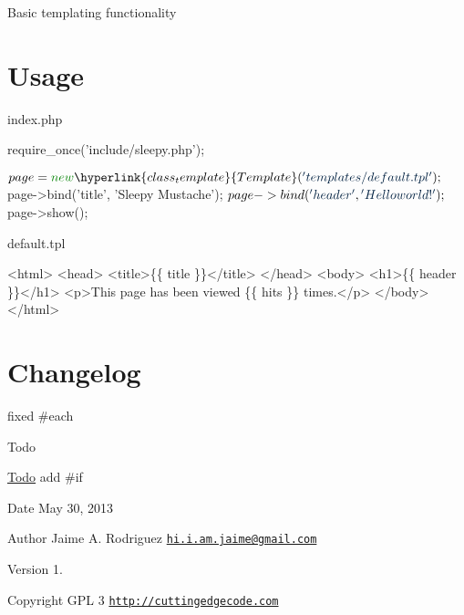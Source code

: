 Basic templating functionality\hypertarget{template1_usage}{}\section{Usage}\label{template1_usage}
index.\-php 
\begin{DoxyCode}
require\_once(\textcolor{stringliteral}{'include/sleepy.php'});

$page = \textcolor{keyword}{new} \hyperlink{class_template}{Template}(\textcolor{stringliteral}{'templates/default.tpl'});
$page->bind(\textcolor{stringliteral}{'title'}, \textcolor{stringliteral}{'Sleepy Mustache'});
$page->bind(\textcolor{stringliteral}{'header'}, \textcolor{stringliteral}{'Hello world!'});
$page->show();
\end{DoxyCode}


default.\-tpl 
\begin{DoxyCode}
   <html>
   <head>
       <title>\{\{ title \}\}</title>
   </head>
   <body>
       <h1>\{\{ header \}\}</h1>
       <p>This page has been viewed \{\{ hits \}\} times.</p>
   </body>
</html>
\end{DoxyCode}
\hypertarget{template1_changelog}{}\section{Changelog}\label{template1_changelog}

\begin{DoxyItemize}
\item fixed \#each
\end{DoxyItemize}

\begin{DoxyRefDesc}{Todo}
\item[\hyperlink{todo__todo000003}{Todo}]add \#if\end{DoxyRefDesc}


\begin{DoxyDate}{Date}
May 30, 2013 
\end{DoxyDate}
\begin{DoxyAuthor}{Author}
Jaime A. Rodriguez \href{mailto:hi.i.am.jaime@gmail.com}{\tt hi.\-i.\-am.\-jaime@gmail.\-com} 
\end{DoxyAuthor}
\begin{DoxyVersion}{Version}
1. 
\end{DoxyVersion}
\begin{DoxyCopyright}{Copyright}
G\-P\-L 3 \href{http://cuttingedgecode.com}{\tt http\-://cuttingedgecode.\-com} 
\end{DoxyCopyright}
